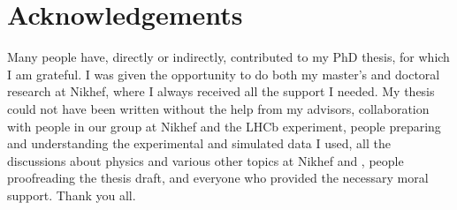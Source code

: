 \chapter*{Acknowledgements}
\thispagestyle{empty}
\chaptermark{}

Many people have, directly or indirectly, contributed to my PhD thesis, for which I am grateful. I was given the opportunity to do both my
master's and doctoral research at Nikhef, where I always received all the support I needed. My thesis could not have been written without
the help from my advisors, collaboration with people in our group at Nikhef and the LHCb experiment, people preparing and understanding the
experimental and simulated data I used, all the discussions about physics and various other topics at Nikhef and \cern, people
proofreading the thesis draft, and everyone who provided the necessary moral support. Thank you all.

\newpage
\thispagestyle{empty}

\cleardoublepage
